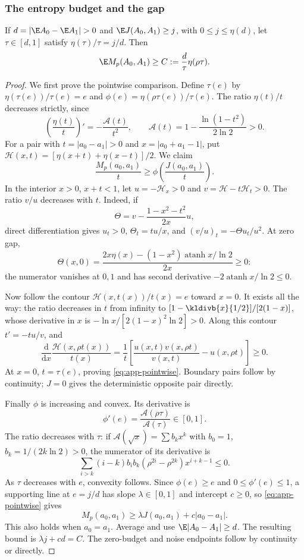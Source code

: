 \subsubsection*{The entropy budget and the gap}
\begin{lemma}\label{lem:app-budget}
If $d=|\E A_0-\E A_1|>0$ and $\E J(A_0,A_1)\ge j$, with $0\le j\le\eta(d)$,
let $\tau\in[d,1]$ satisfy $\eta(\tau)/\tau=j/d$. Then
\begin{equation}\label{eq:app-Cbound}
 \E M_p(A_0,A_1)\ge C:=\frac d\tau\eta(\rho\tau).
\end{equation}
\end{lemma}
\begin{proof}
We first prove the pointwise comparison. Define $\tau(e)$ by
$\eta(\tau(e))/\tau(e)=e$ and
$\phi(e)=\eta(\rho\tau(e))/\tau(e)$. The ratio $\eta(t)/t$ decreases strictly, since
\begin{equation}\label{eq:app-entropyratio}
 \left(\frac{\eta(t)}t\right)'=-\frac{\mathcal A(t)}{t^2},\qquad
 \mathcal A(t)=1-\frac{\ln(1-t^2)}{2\ln2}>0.
\end{equation}
For a pair with $t=|a_0-a_1|>0$ and $x=|a_0+a_1-1|$, put
$\mathcal H(x,t)=[\eta(x+t)+\eta(x-t)]/2$. We claim
\begin{equation}\label{eq:app-pointwise}
 \frac{M_p(a_0,a_1)}t\ge\phi\!\left(\frac{J(a_0,a_1)}t\right).
\end{equation}
In the interior $x>0$, $x+t<1$, let $u=-\mathcal H_x>0$ and $v=\mathcal
H-t\mathcal H_t>0$. The ratio $v/u$ decreases with $t$. Indeed, if
\[
 \Theta=v-\frac{1-x^2-t^2}{2x}u,
\]
direct differentiation gives $u_t>0$, $\Theta_t=tu/x$, and $(v/u)_t=-\Theta
u_t/u^2$. At zero gap,
\[
 \Theta(x,0)=\frac{2x\eta(x)-(1-x^2)\operatorname{atanh} x/\ln2}{2x}\ge0:
\]
the numerator vanishes at $0,1$ and has second derivative
$-2\operatorname{atanh} x/\ln2\le0$.

Now follow the contour $\mathcal H(x,t(x))/t(x)=e$ toward $x=0$. It exists all
the way: the ratio decreases in $t$ from infinity to $[1-\kldivb{x}{1/2}]/[2(1-x)]$, whose
derivative in $x$ is $-\ln x/[2(1-x)^2\ln2]>0$. Along this contour $t'=-tu/v$,
and
\[
 \frac{\mathrm d}{\mathrm d x}\frac{\mathcal H(x,\rho t(x))}{t(x)}
 =\frac1t\left[\frac{u(x,t)v(x,\rho t)}{v(x,t)}-u(x,\rho t)\right]\ge0.
\]
At $x=0$, $t=\tau(e)$, proving \eqref{eq:app-pointwise}. Boundary pairs follow
by continuity; $J=0$ gives the deterministic opposite pair directly.

Finally $\phi$ is increasing and convex. Its derivative is
\[
 \phi'(e)=\frac{\mathcal A(\rho\tau)}{\mathcal A(\tau)}\in[0,1].
\]
The ratio decreases with $\tau$: if $\mathcal A(\sqrt x)=\sum b_kx^k$ with
$b_0=1$, $b_k=1/(2k\ln2)>0$, the numerator of its derivative is
\[
 \sum_{i>k}(i-k)b_ib_k(\rho^{2i}-\rho^{2k})x^{i+k-1}\le0.
\]
As $\tau$ decreases with $e$, convexity follows. Since $\phi(e)\ge e$ and
$0\le\phi'(e)\le1$, a supporting line at $e=j/d$ has slope $\lambda\in[0,1]$
and intercept $c\ge0$, so \eqref{eq:app-pointwise} gives
\[
 M_p(a_0,a_1)\ge\lambda J(a_0,a_1)+c|a_0-a_1|.
\]
This also holds when $a_0=a_1$. Average and use $\E|A_0-A_1|\ge d$. The
resulting bound is $\lambda j+cd=C$. The zero-budget and noise endpoints
follow by continuity or directly.
\end{proof}

